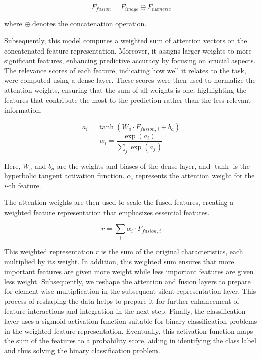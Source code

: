 \documentclass[conference]{IEEEtran}
\begin{document}
\begin{equation}
F_{fusion} = F_{image} \oplus F_{numeric}
\end{equation}

where \( \oplus \) denotes the concatenation operation.

Subsequently, this model computes a weighted sum of attention vectors on the concatenated feature representation. Moreover, it assigns larger weights to more significant features, enhancing predictive accuracy by focusing on crucial aspects. The relevance scores of each feature, indicating how well it relates to the task, were computed using a dense layer. These scores were then used to normalize the attention weights, ensuring that the sum of all weights is one, highlighting the features that contribute the most to the prediction rather than the less relevant information.

\begin{equation}
a_i = \tanh(W_a \cdot F_{fusion,i} + b_a)
\end{equation}
\begin{equation}
\alpha_i = \frac{\exp(a_i)}{\sum_j \exp(a_j)}
\end{equation}

Here, \( W_a \) and \( b_a \) are the weights and biases of the dense layer, and \( \tanh \) is the hyperbolic tangent activation function. \( \alpha_i \) represents the attention weight for the \( i \)-th feature.

The attention weights are then used to scale the fused features, creating a weighted feature representation that emphasizes essential features. 

\begin{equation}
r = \sum_i \alpha_i \cdot F_{fusion,i}
\end{equation}

This weighted representation \( r \) is the sum of the original characteristics, each multiplied by its weight. In addition, this weighted sum ensures that more important features are given more weight while less important features are given less weight. Subsequently, we reshape the attention and fusion layers to prepare for element-wise multiplication in the subsequent silent representation layer. This process of reshaping the data helps to prepare it for further enhancement of feature interactions and integration in the next step. Finally, the classification layer uses a sigmoid activation function suitable for binary classification problems in the weighted feature representation. Eventually, this activation function maps the sum of the features to a probability score, aiding in identifying the class label and thus solving the binary classification problem.
\end{document}
